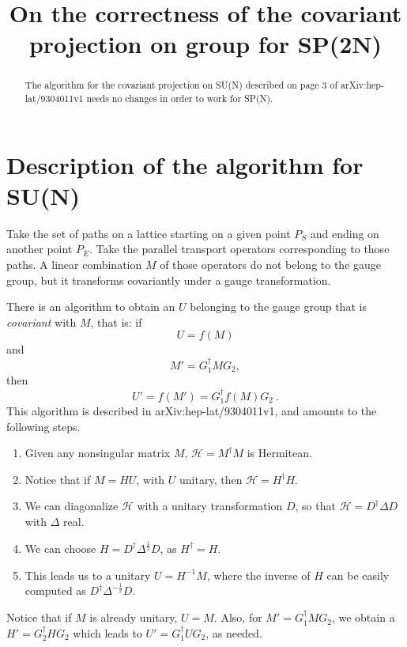 \documentclass[a4paper,10pt]{article}
\title{On the correctness of the covariant projection on group for
  SP(2N)
}
\author{}
\begin{document}
\maketitle

\begin{abstract}
  The algorithm for the covariant projection on SU(N) described on page 3 of
  arXiv:hep-lat/9304011v1 needs no changes in order to work for SP(N).
\end{abstract}

\section{Description of the algorithm for SU(N)}
Take the set of paths on a lattice starting on a given point $P_{S}$ and ending on
another point $P_{E}$.
Take the parallel transport operators corresponding to those paths.
A linear combination $M$ of those operators do not belong to the gauge group,
but it transforms covariantly under a gauge transformation.

There is an algorithm to obtain an $U$ belonging to the gauge group
that is \emph{covariant} with $M$, that is: if
\begin{equation}
  U = f(M)
\end{equation}
and
\begin{equation}
  M'= G_{1}^{\dagger} M G_{2} ,
\end{equation}
then
\begin{equation}
  U' = f(M') = G_{1}^{\dagger} f(M) G_{2} \ .
\end{equation}
This algorithm is described in arXiv:hep-lat/9304011v1, and amounts to the
following steps.
\begin{enumerate}
  \item Given any nonsingular matrix $M$, $\mathcal{H} = M^{\dagger}M$ is
    Hermitean.
    \label{step1}
  \item Notice that if $M = H U$, with $U$ unitary, then
    $\mathcal{H}=H^{\dagger}H$.
    \label{step2}
  \item We can diagonalize $\mathcal{H}$ with a unitary transformation $D$, so
    that $\mathcal{H}= D^{\dagger} \Delta D$ with $\Delta$ real.
    \label{step3}
  \item We can choose $H = D^{\dagger} \Delta^{\frac{1}{2}} D$, as $H^{\dagger} = H$.
    \label{step4}
  \item This leads us to a unitary $U = H^{-1} M$, where the inverse of $H$ can
    be easily computed as $D^{\dagger} \Delta^{-\frac{1}{2}} D$.
  \label{step5}
\end{enumerate}
Notice that if $M$ is already unitary, $U=M$. Also, for
$M' = G_{1}^{\dagger}M G_{2}$, we obtain a $H' = G_{2}^{\dagger} H G_{2}$ which
leads to $U'=G_{1}^{\dagger}U G_{2}$, as needed.
\end{document}
